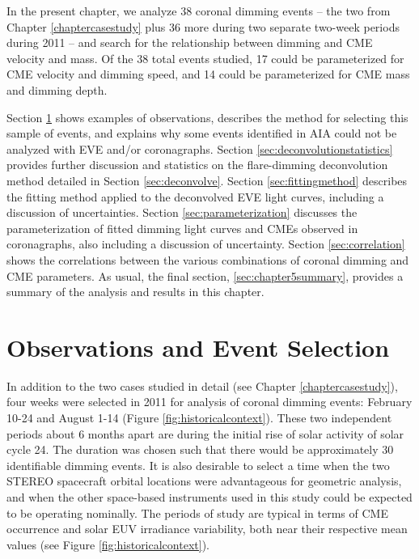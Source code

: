 In the present chapter, we analyze 38 coronal dimming events -- the two from Chapter \ref{chaptercasestudy} plus 36 more during two separate two-week periods during 2011 -- and search for the relationship between dimming and CME velocity and mass. Of the 38 total events studied, 17 could be parameterized for CME velocity and dimming speed, and 14 could be parameterized for CME mass and dimming depth. 

Section \ref{sec:eventselection} shows examples of observations, describes the method for selecting this sample of events, and explains why some events identified in AIA could not be analyzed with EVE and/or coronagraphs. Section \ref{sec:deconvolutionstatistics} provides further discussion and statistics on the flare-dimming deconvolution method detailed in Section \ref{sec:deconvolve}. Section \ref{sec:fittingmethod} describes the fitting method applied to the deconvolved EVE light curves, including a discussion of uncertainties. Section \ref{sec:parameterization} discusses the parameterization of fitted dimming light curves and CMEs observed in coronagraphs, also including a discussion of uncertainty. Section \ref{sec:correlation} shows the correlations between the various combinations of coronal dimming and CME parameters. As usual, the final section, \ref{sec:chapter5summary}, provides a summary of the analysis and results in this chapter. 

\section{Observations and Event Selection}
\label{sec:eventselection}
In addition to the two cases studied in detail (see Chapter \ref{chaptercasestudy}), four weeks were selected in 2011 for analysis of coronal dimming events: February 10-24 and August 1-14 (Figure \ref{fig:historicalcontext}). These two independent periods about 6 months apart are during the initial rise of solar activity of solar cycle 24. The duration was chosen such that there would be approximately 30 identifiable dimming events. It is also desirable to select a time when the two STEREO spacecraft orbital locations were advantageous for geometric analysis, and when the other space-based instruments used in this study could be expected to be operating nominally. The periods of study are typical in terms of CME occurrence and solar EUV irradiance variability, both near their respective mean values (see Figure \ref{fig:historicalcontext}).
 
